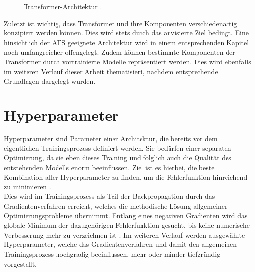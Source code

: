\begin{figure}[h!]
  \centering
  \caption{Transformer-Architektur \cite[S.~399]{ZHA20}.}
  \label{pic:TransformerArchitecture}
\end{figure}

\noindent
Zuletzt ist wichtig, dass Transformer und ihre Komponenten verschiedenartig konzipiert werden können. Dies wird stets durch das anvisierte Ziel bedingt. Eine hinsichtlich der \ac{ATS} geeignete Architektur wird in einem entsprechenden Kapitel noch umfangreicher offengelegt. Zudem können bestimmte Komponenten der Transformer durch vortrainierte Modelle repräsentiert werden. Dies wird ebenfalls im weiteren Verlauf dieser Arbeit thematisiert, nachdem entsprechende Grundlagen dargelegt wurden.
\newpage


\section{Hyperparameter}
\noindent
Hyperparameter sind Parameter einer Architektur, die bereits vor dem eigentlichen Trainingsprozess definiert werden. Sie bedürfen einer separaten Optimierung, da sie eben dieses Training und folglich auch die Qualität des entstehenden Modells enorm beeinflussen. Ziel ist es hierbei, die beste Kombination aller Hyperparameter zu finden, um die Fehlerfunktion hinreichend zu minimieren \cite[S.~1]{YAN20}.\\

\noindent
Dies wird im Trainingsprozess als Teil der Backpropagation durch das Gradientenverfahren erreicht, welches die methodische Lösung allgemeiner Optimierungsprobleme übernimmt. Entlang eines negativen Gradienten wird das globale Minimum der dazugehörigen Fehlerfunktion gesucht, bis keine numerische Verbesserung mehr zu verzeichnen ist \cite[S.~428]{ZHA20}. Im weiteren Verlauf werden ausgewählte Hyperparameter, welche das Gradientenverfahren und damit den allgemeinen Trainingsprozess hochgradig beeinflussen, mehr oder minder tiefgründig vorgestellt.\\

